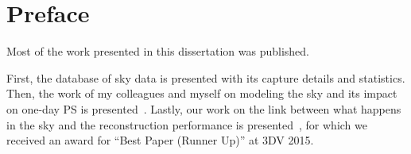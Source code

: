 \chapter*{Preface}         %

Most of the work presented in this dissertation was published. 

First, the database of sky data is presented with its capture details and statistics. Then, the work of my colleagues and myself on modeling the sky and its impact on one-day PS is presented~\cite{holdgeoffroy-iccp-15}. Lastly, our work on the link between what happens in the sky and the reconstruction performance is presented~\cite{holdgeoffroy-3dv-15}, for which we received an award for ``Best Paper (Runner Up)'' at 3DV 2015.
